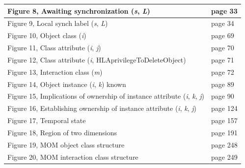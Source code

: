 \begin{annexstdpage}
\begin{center}
\begin{tabular}{|>{\RaggedRight\arraybackslash}p{4.65in}|>{\RaggedRight\arraybackslash}p{1.07in}|}
            \hline
            Figure 8, Awaiting synchronization (\textit{s}, \textit{L})                                     & page 33                                    \\
            \hline
            Figure 9, Local synch label (\textit{s}, \textit{L})                                            & page 34                                    \\
            \hline
            Figure 10, Object class (\textit{i})                                                            & page 69                                    \\
            \hline
            Figure 11, Class attribute (\textit{i}, \textit{j})                                             & page 70                                    \\
            \hline
            Figure 12, Class attribute (\textit{i}, HLAprivilegeToDeleteObject)                             & page 71                                    \\
            \hline
            Figure 13, Interaction class (\textit{m})                                                       & page 72                                    \\
            \hline
            Figure 14, Object instance (\textit{i}, \textit{k}) known                                       & page 89                                    \\
            \hline
            Figure 15, Implications of ownership of instance attribute (\textit{i}, \textit{k}, \textit{j}) & page 90 \\
            \hline
            Figure 16, Establishing ownership of instance attribute (\textit{i}, \textit{k}, \textit{j}) & page 124 \\
            \hline
            Figure 17, Temporal state                                                                       & page 157                                   \\
            \hline
            Figure 18, Region of two dimensions                                                             & page 191                                   \\
            \hline
            Figure 19, MOM object class structure                                                           & page 248                                   \\
            \hline
            Figure 20, MOM interaction class structure                                                      & page 249                                   \\
            \hline
        \end{tabular}
        \endgroup
    \end{center}
\end{annexstdpage}
